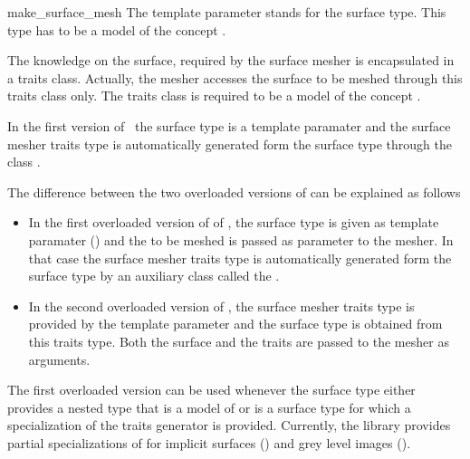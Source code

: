 \begin{ccRefFunction}{make_surface_mesh}
The template parameter   stands for the surface type.
This type has to be a model of the concept .

The knowledge on the surface, required by the surface mesher
is  encapsulated in a
traits class. Actually, the mesher accesses the surface to be meshed
through this traits class only. 
The traits class is required to be a model
of the concept .

In the first  version
of  \ccRefName\, the surface type is a template paramater 
and the surface mesher traits type 
is  automatically generated form the surface type  through
the class 
.

The difference between the two overloaded versions of
can be explained as follows
\begin{itemize}
\item
In the first  overloaded version of
of ,  the surface type  is given  
as template paramater  () and the 
to be meshed is passed as parameter to the mesher.
In that case the surface mesher traits type 
is  automatically generated form the surface type
by an auxiliary class called  the .
\item In the second overloaded version of , 
the surface mesher traits type is provided
by the  template parameter 
and the surface type is obtained from this traits type.
Both the surface and the traits 
are passed to the mesher as arguments. 
\end{itemize}


The first overloaded version can be used
whenever the surface type either provides  a nested type
that is  a model of 
or is a surface type for which a specialization
of the traits generator 
is provided.
Currently, the library provides partial specializations
of  
for implicit surfaces () and 
grey level images ().




\end{ccRefFunction}
